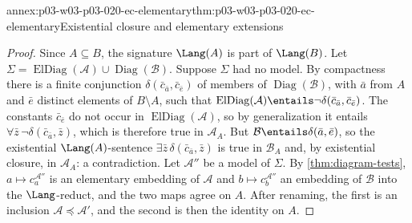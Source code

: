 \begin{annexitem}{annex:p03-w03-p03-020-ec-elementary}{thm:p03-w03-p03-020-ec-elementary}{Existential closure and elementary extensions}
\begin{proof}
Since \(A\subseteq B\), the signature \(\Lang(A)\) is part of \(\Lang(B)\).
Let \(\Sigma=\operatorname{ElDiag}(\mathcal A)\cup\operatorname{Diag}(\mathcal B)\).
Suppose \(\Sigma\) had no model. By compactness there is a finite
conjunction \(\delta(\bar c_{\bar a},\bar c_{\bar e})\) of members of
\(\operatorname{Diag}(\mathcal B)\), with \(\bar a\) from \(A\) and
\(\bar e\) distinct elements of \(B\setminus A\), such that
\(\operatorname{ElDiag}(\mathcal A)\entails\neg\delta(\bar c_{\bar a},
\bar c_{\bar e})\). The constants \(\bar c_{\bar e}\) do not occur in
\(\operatorname{ElDiag}(\mathcal A)\), so by generalization it entails
\(\forall\bar z\,\neg\delta(\bar c_{\bar a},\bar z)\), which is therefore
true in \(\mathcal A_A\). But \(\mathcal B\entails\delta(\bar a,\bar e)\), so
the existential \(\Lang(A)\)-sentence
\(\exists\bar z\,\delta(\bar c_{\bar a},\bar z)\) is true in
\(\mathcal B_A\) and, by existential closure, in \(\mathcal A_A\): a
contradiction. Let \(\mathcal A''\) be a model of \(\Sigma\). By
\cref{thm:diagram-tests}, \(a\mapsto c_a^{\mathcal A''}\) is an elementary
embedding of \(\mathcal A\) and \(b\mapsto c_b^{\mathcal A''}\) an embedding of
\(\mathcal B\) into the \(\Lang\)-reduct, and the two maps agree on \(A\).
After renaming, the first is an inclusion \(\mathcal A\preccurlyeq
\mathcal A'\), and the second is then the identity on \(A\).
\end{proof}
\end{annexitem}

